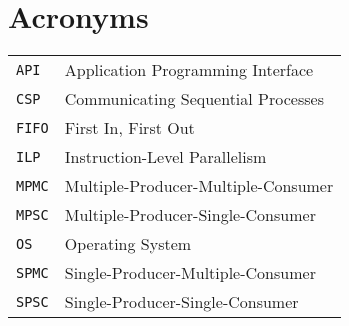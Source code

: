 
\chapter{Acronyms}
\label{ch:acronyms}

\begin{table}[h!]
    \centering
    \begin{tabular}{ll}
        \texttt{API}  & Application Programming Interface \\
        \texttt{CSP}  & Communicating Sequential Processes \\
        \texttt{FIFO} & First In, First Out \\
        \texttt{ILP}  & Instruction-Level Parallelism \\
        \texttt{MPMC} & Multiple\hyp{}Producer\hyp{}Multiple\hyp{}Consumer \\
        \texttt{MPSC} & Multiple\hyp{}Producer\hyp{}Single\hyp{}Consumer \\
        \texttt{OS}   & Operating System \\
        \texttt{SPMC} & Single\hyp{}Producer\hyp{}Multiple\hyp{}Consumer \\
        \texttt{SPSC} & Single\hyp{}Producer\hyp{}Single\hyp{}Consumer \\
    \end{tabular}
\end{table}